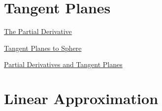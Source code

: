 \documentclass{ximera}
\begin{document}
\section{Tangent Planes}
\begin{exploration}  \label{Edf754665}

 
\begin{onlineOnly}
    \begin{center}
\end{center}
\end{onlineOnly}


\href{https://www.desmos.com/calculator/y0h5kuvmbt}{The Partial Derivative}

\end{exploration}



\begin{exploration}  \label{Edf5khj4665}

\href{https://www.desmos.com/3d/d78d5a3138}{Tangent Planes to Sphere}

\end{exploration}

\begin{exploration}  \label{Ede5fhj4665}
\href{https://www.geogebra.org/m/Hud6Hnpk}{Partial Derivatives and Tangent Planes}
\end{exploration}


\section{Linear Approximation}
\end{document}
